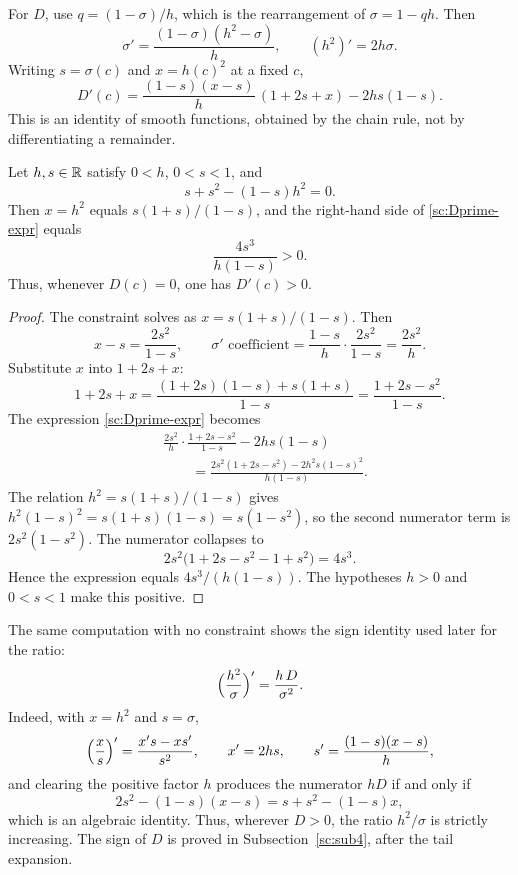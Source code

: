 For \(D\), use \(q=(1-\sigma)/h\), which is the rearrangement of \(\sigma=1-qh\). Then
\[
\sigma'=\frac{(1-\sigma)(h^2-\sigma)}{h},\qquad (h^2)'=2h\sigma.
\]
Writing \(s=\sigma(c)\) and \(x=h(c)^2\) at a fixed \(c\),
\begin{equation}
\label{sc:Dprime-expr}
D'(c)=\frac{(1-s)(x-s)}{h}\,(1+2s+x)-2hs(1-s).
\end{equation}
This is an identity of smooth functions, obtained by the chain rule, not by differentiating a remainder.

\begin{lemma}\label{sc:lemma2.1}
Let \(h,s\in\mathbb R\) satisfy \(0<h\), \(0<s<1\), and
\[
s+s^2-(1-s)h^2=0.
\]
Then \(x=h^2\) equals \(s(1+s)/(1-s)\), and the right-hand side of \eqref{sc:Dprime-expr} equals
\[
\frac{4s^3}{h(1-s)}>0.
\]
Thus, whenever \(D(c)=0\), one has \(D'(c)>0\).

\end{lemma}
\begin{proof}
The constraint solves as \(x=s(1+s)/(1-s)\). Then
\[
x-s=\frac{2s^2}{1-s},\qquad \sigma'\text{ coefficient}=\frac{1-s}{h}\cdot\frac{2s^2}{1-s}=\frac{2s^2}{h}.
\]
Substitute \(x\) into \(1+2s+x\):
\[
1+2s+x=\frac{(1+2s)(1-s)+s(1+s)}{1-s}=\frac{1+2s-s^2}{1-s}.
\]
The expression \eqref{sc:Dprime-expr} becomes
\begin{align*}
&\frac{2s^2}{h}\cdot\frac{1+2s-s^2}{1-s}-2hs(1-s)\\
&\qquad=\frac{2s^2(1+2s-s^2)-2h^2 s(1-s)^2}{h(1-s)}.
\end{align*}
The relation \(h^2=s(1+s)/(1-s)\) gives \(h^2(1-s)^2=s(1+s)(1-s)=s(1-s^2)\), so the second numerator term is \(2s^2(1-s^2)\). The numerator collapses to
\[
2s^2\bigl(1+2s-s^2-1+s^2\bigr)=4s^3.
\]
Hence the expression equals \(4s^3/(h(1-s))\). The hypotheses \(h>0\) and \(0<s<1\) make this positive.

\end{proof}


The same computation with no constraint shows the sign identity used later for the ratio:
\[
\Bigl(\frac{h^2}{\sigma}\Bigr)'=\frac{h\,D}{\sigma^2}.
\]
Indeed, with \(x=h^2\) and \(s=\sigma\),
\[
\Bigl(\frac{x}{s}\Bigr)'=\frac{x's-xs'}{s^2},\qquad x'=2hs,\qquad s'=\frac{(1-s)(x-s)}{h},
\]
and clearing the positive factor \(h\) produces the numerator \(hD\) if and only if
\[
2s^2-(1-s)(x-s)=s+s^2-(1-s)x,
\]
which is an algebraic identity. Thus, wherever \(D>0\), the ratio \(h^2/\sigma\) is strictly increasing. The sign of \(D\) is proved in Subsection~\ref{sc:sub4}, after the tail expansion.

